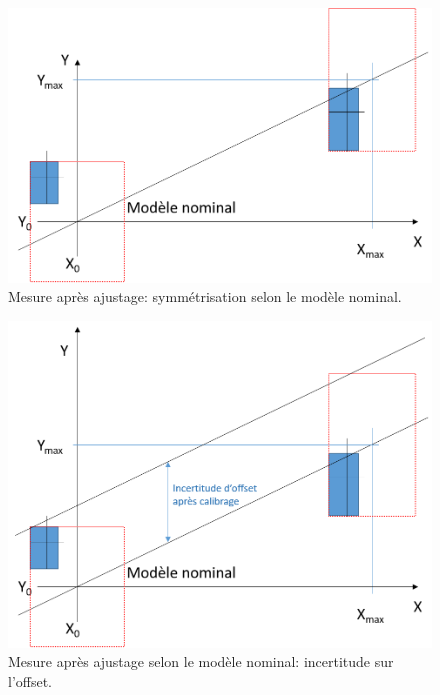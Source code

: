 \documentclass[main.tex]{subfiles}
\begin{document}
\begin{figure}
    \centering
    \includegraphics[width=12cm]{assets/figures/Ajustage_symmetrisation_nominal.PNG}
    \caption{Mesure après ajustage: symmétrisation selon le modèle nominal.}
    \label{fig:Ajustage_symmetrisation_nominal}
\end{figure}

\begin{figure}
    \centering
    \includegraphics[width=12cm]{assets/figures/Ajustage_nominal_offset.PNG}
    \caption{Mesure après ajustage selon le modèle nominal: incertitude sur l'offset.}
    \label{fig:Ajustage_nominal_offset}
\end{figure}
\end{document}
